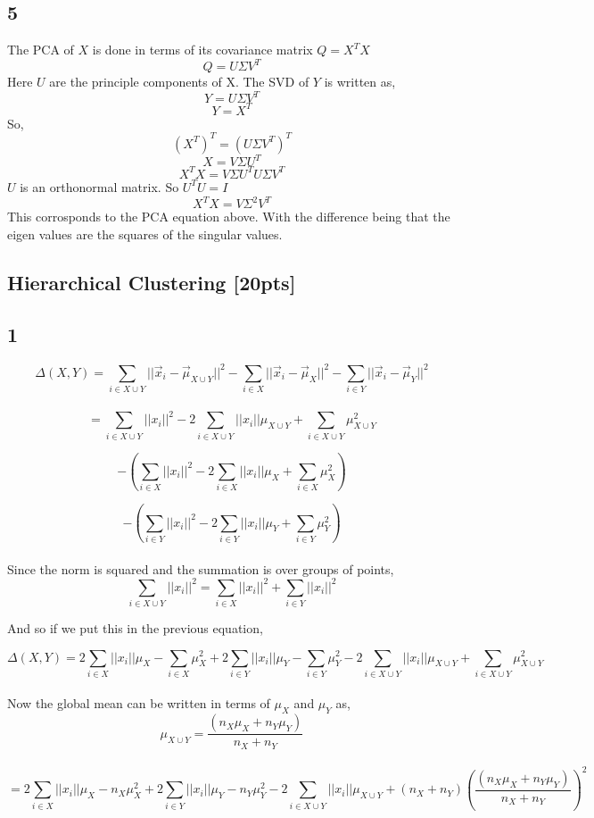 \documentclass[paper=a4, fontsize=11pt]{scrartcl} %
\numberwithin{figure}{section} %
\numberwithin{table}{section} %
\begin{document}
\subsection*{5}
The PCA of $X$ is done in terms of its covariance matrix $Q=X^{T}X$
$$ Q = U \Sigma V^{T}$$
Here $U$ are the principle components of X.
The SVD of $Y$ is written as,
$$Y=U \Sigma V^{T}$$
$$Y=X^{T}$$
So,
$$(X^{T})^{T}=\left(U \Sigma V^{T} \right)^{T}$$
$$X=V \Sigma U^{T}$$
$$X^{T}X=V \Sigma U^{T}U \Sigma V^{T}$$
$U$ is an orthonormal matrix. So $U^{T}U=I$
$$X^{T}X=V \Sigma^{2} V^{T}$$
This corrosponds to the PCA equation above. With the difference being that the eigen values are the squares of the singular values.
\subsection{Hierarchical Clustering \textbf{[20pts]}}

\subsection*{1}
$$
\Delta(X, Y) = \sum_{i \in X \cup Y} ||\vec{x}_i - \vec{\mu}_{X \cup Y} ||^2 - \sum_{i \in X} || \vec{x}_i - \vec{\mu}_X ||^2 - \sum_{i \in Y} || \vec{x}_i - \vec{\mu}_Y ||^2
$$
\\
$$
= \sum_{i \in X \cup Y} ||x_{i}||^{2} - 2 \sum_{i \in X \cup Y}||x_{i}||\mu_{X \cup Y} + \sum_{i \in X \cup Y} \mu_{X \cup Y}^{2}
$$

$$
- \left( \sum_{i \in X} ||x_{i}||^{2} - 2 \sum_{i \in X}||x_{i}||\mu_{X} + \sum_{i \in X} \mu_{X}^{2} \right)
$$

$$
- \left( \sum_{i \in Y} ||x_{i}||^{2} - 2 \sum_{i \in Y}||x_{i}||\mu_{Y} + \sum_{i \in Y} \mu_{Y}^{2} \right)
$$
\\
Since the norm is squared and the summation is over groups of points,
$$
\sum_{i \in X \cup Y} ||x_{i}||^{2} = \sum_{i \in X}||x_{i}||^{2} + \sum_{i \in Y}||x_{i}||^{2}
$$

And so if we put this in the previous equation,

$$
\Delta(X, Y) = 2 \sum_{i \in X}||x_{i}||\mu_{X} - \sum_{i \in X} \mu_{X}^{2} + 2 \sum_{i \in Y}||x_{i}||\mu_{Y} - \sum_{i \in Y} \mu_{Y}^{2} - 2 \sum_{i \in X \cup Y}||x_{i}||\mu_{X \cup Y} + \sum_{i \in X \cup Y} \mu_{X \cup Y}^{2}
$$
\\
Now the global mean can be written in terms of $\mu_{X}$ and $\mu_{Y}$ as,
$$
\mu_{X \cup Y}=\frac{(n_{X}\mu_{X}+n_{Y}\mu_{Y})}{n_{X}+n_{Y}}
$$
\\
$$
= 2 \sum_{i \in X}||x_{i}||\mu_{X} - n_{X}\mu_{X}^{2} + 2 \sum_{i \in Y}||x_{i}||\mu_{Y} - n_{Y} \mu_{Y}^{2} - 2 \sum_{i \in X \cup Y}||x_{i}||\mu_{X \cup Y} + (n_{X}+n_{Y})\left( \frac{(n_{X}\mu_{X}+n_{Y}\mu_{Y})}{n_{X}+n_{Y}}\right)^{2}
$$
\end{document}
